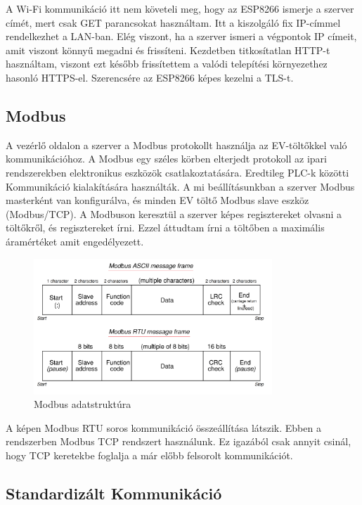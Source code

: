 A Wi-Fi kommunikáció itt nem követeli meg, hogy az ESP8266 ismerje a szerver címét, mert csak GET parancsokat
használtam. Itt a kiszolgáló fix IP-címmel rendelkezhet a LAN-ban. Elég viszont, ha a szerver ismeri a végpontok IP címeit,
amit viszont könnyű megadni és frissíteni.
Kezdetben titkosítatlan HTTP-t használtam, viszont ezt később frissítettem a valódi telepítési környezethez hasonló 
HTTPS-el. Szerencsére az ESP8266 képes kezelni a TLS-t.

\subsection{Modbus}

A vezérlő oldalon a szerver a Modbus protokollt használja az EV-töltőkkel való kommunikációhoz. 
A Modbus egy széles körben elterjedt protokoll az ipari rendszerekben elektronikus eszközök csatlakoztatására. 
Eredtileg PLC-k közötti Kommunikáció kialakítására használták.
A mi beállításunkban a szerver Modbus masterként van konfigurálva, 
és minden EV töltő Modbus slave eszköz (Modbus/TCP). A Modbuson keresztül a szerver képes regisztereket olvasni a 
töltőkről, és regisztereket írni. Ezzel áttudtam írni a töltőben a maximális áramértéket amit engedélyezett. 
\cite{mcuoneclipse:evcharger}

\begin{figure}[!ht]
    \centering
    \includegraphics[width=0.8\textwidth, keepaspectratio]{figures/Modbus_Frame.png}
    \caption{Modbus adatstruktúra \cite{instrumentationtools:modbus}} 
\end{figure}

A képen Modbus RTU soros kommunikáció összeállítása látszik. Ebben a rendszerben Modbus TCP rendszert használunk.
Ez igazából csak annyit csinál, hogy TCP keretekbe foglalja a már előbb felsorolt kommunikációt.

\subsection{Standardizált Kommunikáció}

